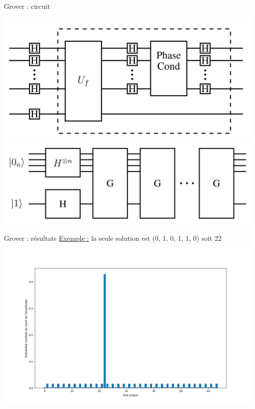 \documentclass[french]{beamer}
\begin{document}
\begin{frame}{Grover : circuit}
    \begin{center}
        \includegraphics[scale=0.08]{PorteGrover.png}
        \includegraphics[scale=0.08]{CircuitGrover.png}
    \end{center}
\end{frame}

\begin{frame}{Grover : résultats}
    \underline{Exemple :} la seule solution est (0, 1, 0, 1, 1, 0) soit 22
    \begin{center}
        \includegraphics[scale=0.3]{Grover.png}
    \end{center}
\end{frame}
\end{document}
